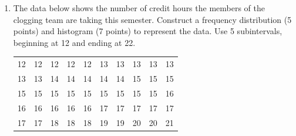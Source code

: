 \documentclass[12pt]{article}
\begin{document}
\begin{enumerate}
\item
The data below shows the number of credit hours the members of the clogging team are taking this semester.  Construct a frequency distribution (5 points) and histogram (7 points) to represent the data.  Use 5 subintervals, beginning at 12 and ending at 22.
\begin{center}
\begin{tabular}{cccccccccc}
12&12&12&12&12&13&13&13&13&13\\
13&13&14&14&14&14&14&15&15&15\\
15&15&15&15&15&15&15&15&15&16\\
16&16&16&16&16&17&17&17&17&17\\
17&17&18&18&18&19&19&20&20&21
\end{tabular}
\end{center}


\end{enumerate}
\end{document}
